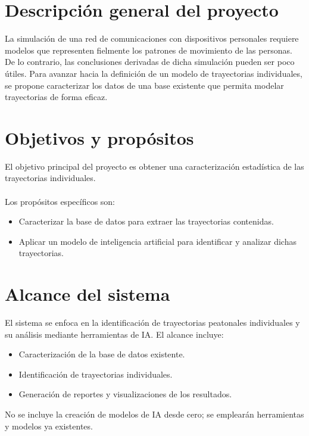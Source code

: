 \section{Descripción general del proyecto}
\label{sec:descripcion}

\noindent La simulación de una red de comunicaciones con dispositivos personales requiere modelos que representen fielmente los patrones de movimiento de las personas. De lo contrario, las conclusiones derivadas de dicha simulación pueden ser poco útiles. Para avanzar hacia la definición de un modelo de trayectorias individuales, se propone caracterizar los datos de una base existente que permita modelar trayectorias de forma eficaz.

\vspace{-1ex}
\section{Objetivos y propósitos}
\label{sec:objetivos}

\noindent El objetivo principal del proyecto es obtener una caracterización estadística de las trayectorias individuales. \\ \\
Los propósitos específicos son:
\vspace{-1ex}
\begin{itemize}
    \setlength\itemsep{0pt}
    \item Caracterizar la base de datos para extraer las trayectorias contenidas.
    \item Aplicar un modelo de inteligencia artificial para identificar y analizar dichas trayectorias.
\end{itemize}

\vspace{-1ex}
\section{Alcance del sistema}
\label{sec:alcance}

\noindent El sistema se enfoca en la identificación de trayectorias peatonales individuales y su análisis mediante herramientas de IA. El alcance incluye:
\vspace{-1ex}
\begin{itemize}
    \setlength\itemsep{0pt}
    \item Caracterización de la base de datos existente.
    \item Identificación de trayectorias individuales.
    \item Generación de reportes y visualizaciones de los resultados.
\end{itemize}

\noindent No se incluye la creación de modelos de IA desde cero; se emplearán herramientas y modelos ya existentes.
